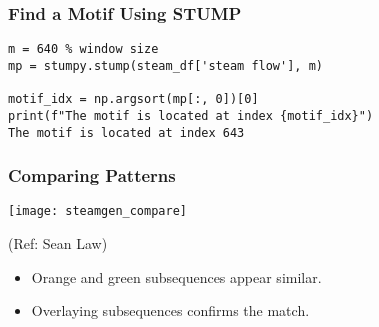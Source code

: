 \begin{frame}[fragile]\frametitle{Find a Motif Using STUMP}
		
		
\begin{lstlisting}
m = 640 % window size
mp = stumpy.stump(steam_df['steam flow'], m)

motif_idx = np.argsort(mp[:, 0])[0]
print(f"The motif is located at index {motif_idx}")
The motif is located at index 643
\end{lstlisting}

\end{frame}

\begin{frame}[fragile]\frametitle{Comparing Patterns}


	
      \begin{center}
        \texttt{[image: steamgen\_compare]}

		{\tiny (Ref: Sean Law)}		
        \end{center}
		
	\begin{itemize}
		\item Orange and green subsequences appear similar.
		\item Overlaying subsequences confirms the match.
	\end{itemize}
		
		
\end{frame}

